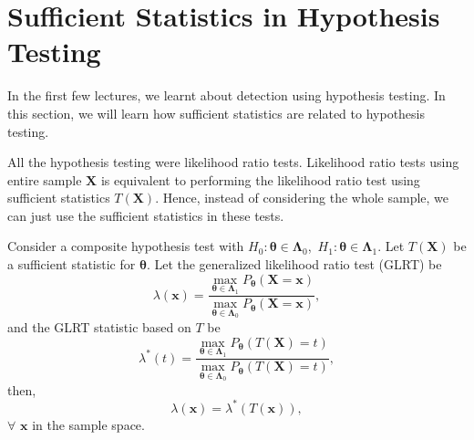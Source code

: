\documentclass[a4paper,english,12pt]{article}
\newcommand{\bx}{\mathbf{x}}
\newcommand{\bX}{\mathbf{X}}
\newcommand{\btheta}{\boldsymbol{\theta}}
\newcommand{\bLambda}{\boldsymbol{\Lambda}}
\begin{document}
\section{Sufficient Statistics in Hypothesis Testing}
In the first few lectures, we learnt about detection using hypothesis testing. In this section, we will learn how sufficient statistics are related to hypothesis testing.
\par All the hypothesis testing were likelihood ratio tests. Likelihood ratio tests using entire sample $\bX$ is equivalent to performing the likelihood ratio test using sufficient statistics $T(\bX)$. Hence, instead of considering the whole sample, we can just use the sufficient statistics in these tests.
\begin{thm}
Consider a composite hypothesis test with $H_0:\btheta\in{\bLambda}_0$,~$H_1:\btheta\in{\bLambda}_1$. Let $T(\bX)$ be a sufficient statistic for $\btheta$. Let the generalized likelihood ratio test (GLRT) be 
\begin{equation}
\lambda(\bx) =\dfrac{\displaystyle\max_{\btheta\in{\bLambda}_1} P_{\btheta}(\bX=\bx)}{\displaystyle\max_{\btheta\in{\bLambda}_0} P_{\btheta}(\bX=\bx)},
\end{equation}
and the GLRT statistic based on $T$ be
\begin{equation}
\lambda^*(t) =\dfrac{\displaystyle\max_{\btheta\in{\bLambda}_1} P_{\btheta}(T(\bX)=t)}{\displaystyle\max_{\btheta\in{\bLambda}_0} P_{\btheta}(T(\bX)=t)},
\end{equation}
then, 
\begin{equation}
\lambda(\bx) = \lambda^*(T(\bx)), 
\end{equation}
$\forall$ $\bx$ in the sample space.
\end{thm}
\end{document}
